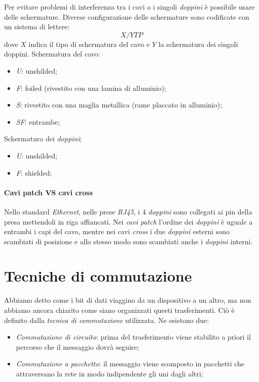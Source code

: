 Per evitare problemi di interferenza tra i cavi o i singoli \emph{doppini} è
possibile usare delle schermature. Diverse configurazione delle schermature sono
codificate con un sistema di lettere:
\[X/YTP\]
dove $X$ indica il tipo di schermatura del cavo e $Y$ la schermatura dei singoli
doppini.
\newline Schermatura del cavo:
\begin{itemize}
    \item \emph{U}: unshilded;
    \item \emph{F}: foiled (rivestito con una lamina di alluminio);
    \item \emph{S}: rivestito con una maglia metallica (rame placcato in alluminio);
    \item \emph{SF}: entrambe;
\end{itemize}
Schermatura dei \emph{doppini};
\begin{itemize}
    \item \emph{U}: unshilded;
    \item \emph{F}: shielded;
\end{itemize}

\paragraph{Cavi patch VS cavi cross}
Nello standard \emph{Ethernet}, nelle prese \emph{RJ45}, i 4 \emph{doppini} sono
collegati ai pin della presa mettendoli in riga affiancati. Nei \emph{cavi patch}
l'ordine dei \emph{doppini} è uguale a entrambi i capi del cavo, mentre nei cavi
\emph{cross} i due \emph{doppini} esterni sono scambiati di posizione e allo
stesso modo sono scambiati anche i \emph{doppini} interni.

\section{Tecniche di commutazione}
Abbiamo detto come i bit di dati viaggino da un dispositivo a un altro, ma non
abbiamo ancora chiarito come siano organizzati questi trasferimenti. Ciò è definito
dalla \emph{tecnica di commutazione} utilizzata. Ne esistono due:
\begin{itemize}
    \item \emph{Commutazione di circuito}: prima del trasferimento viene stabilito
    a priori il percorso che il messaggio dovrà seguire;
    \item \emph{Commutazione a pacchetto}: il messaggio viene scomposto in pacchetti
    che attraversano la rete in modo indipendente gli uni dagli altri;
\end{itemize}

